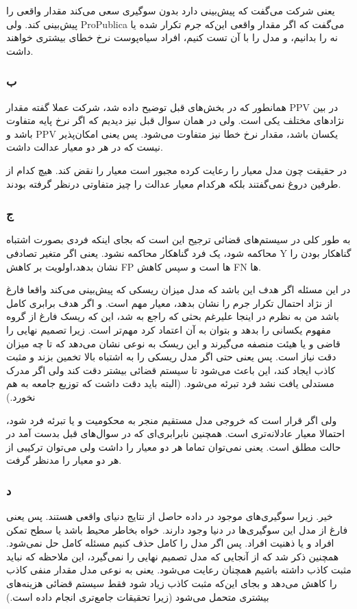 یعنی شرکت می‌گفت که پیش‌بینی دارد بدون سوگیری سعی می‌کند مقدار واقعی را پیش‌بینی کند. ولی 
ProPublica
می‌گفت که اگر مقدار واقعی این‌که جرم تکرار شده یا نه را بدانیم، و مدل را با آن تست کنیم، افراد سیاه‌پوست نرخ خطای بیشتری خواهند داشت. 

\subsubsection{ب}
همانطور که در بخش‌های قبل توضیح داده شد، شرکت عملا گفته مقدار 
PPV
در بین نژادهای مختلف یکی است. ولی در همان سوال قبل نیز دیدیم که اگر نرخ پایه متفاوت باشد و PPV یکسان باشد، مقدار نرخ خطا نیز متفاوت می‌شود. پس یعنی امکان‌پذیر نیست که در هر دو معیار عدالت داشت. 

در حقیقت چون مدل معیار 
را رعایت کرده مجبور است معیار 
را نقض کند. هیچ کدام از طرفین دروغ نمی‌گفتند بلکه هرکدام معیار عدالت را چیز متفاوتی درنظر گرفته بودند. 
\subsubsection{ج}
به طور کلی در سیستم‌های قضائی ترجیح این است که بجای اینکه فردی بصورت اشتباه محاکمه شود، یک فرد گناهکار محاکمه نشود. یعنی اگر متغیر تصادفی Y گناهکار بودن را نشان بدهد،‌اولویت بر کاهش 
FP 
ها است و سپس کاهش FN ها.

در این مسئله اگر هدف این باشد که مدل میزان ریسکی که پیش‌بینی می‌کند واقعا فارغ از نژاد احتمال تکرار جرم را نشان بدهد، معیار  مهم است. و اگر هدف برابری کامل باشد  من به نظرم در اینجا علیرغم بحثی که راجع به  شد، این که ریسک فارغ از گروه مفهوم یکسانی را بدهد و بتوان به آن اعتماد کرد مهم‌تر است. زیرا تصمیم نهایی را قاضی و یا هیئت منصفه می‌گیرند و این ریسک به نوعی نشان می‌دهد که تا چه میزان دقت نیاز است. پس یعنی حتی اگر مدل ریسکی را به اشتباه بالا تخمین بزند و مثبت کاذب ایجاد کند، این باعث می‌شود تا سیستم قضائی بیشتر دقت کند ولی اگر مدرک مستدلی یافت نشد فرد تبرئه می‌شود.  (البته باید دقت داشت که توزیع جامعه به هم نخورد.)

ولی اگر قرار است که خروجی مدل مستقیم منجر به محکومیت و یا تبرئه فرد شود،  احتمالا معیار عادلانه‌تری است. همچنین نابرابری‌ای که در سوال‌های قبل بدست آمد در حالت مطلق است. یعنی نمی‌توان تماما هر دو معیار را داشت ولی می‌توان ترکیبی از هر دو معیار را مدنظر گرفت.

\subsubsection{د}
خیر. زیرا سوگیری‌های موجود در داده حاصل از نتایج دنیای واقعی هستند. پس یعنی فارغ از مدل این سوگیری‌ها در دنیا وجود دارند. خواه بخاطر محیط باشد یا سطح تمکن افراد و یا ذهنیت افراد. پس اگر مدل را کامل حذف کنیم مسئله کامل حل نمی‌شود. همچنین ذکر شد که از آنجایی که مدل تصمیم نهایی را نمی‌گیرد، این ملاحظه که نباید مثبت کاذب داشته باشیم همچنان رعایت می‌شود. یعنی به نوعی مدل مقدار منفی کاذب را کاهش می‌دهد و بجای این‌که مثبت کاذب زیاد شود فقط سیستم قضائی هزینه‌های بیشتری متحمل می‌شود (زیرا تحقیقات جامع‌تری انجام داده است.)

